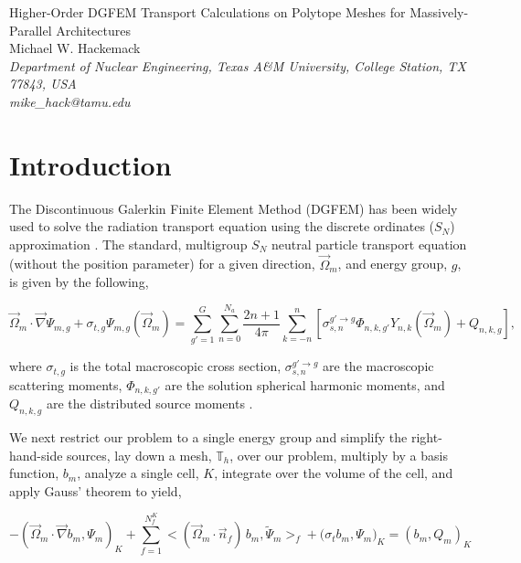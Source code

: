 \documentclass[11pt]{article}
\begin{document}
\begin{center}
{\Large Higher-Order DGFEM Transport Calculations on Polytope Meshes for Massively-Parallel Architectures}\\[8mm]
{Michael W. Hackemack} \\[2mm]
{\em \small Department of Nuclear Engineering, Texas A\&M University, College Station, TX 77843, USA} \\[1mm]
{\em mike\_hack@tamu.edu} \\[6mm]
\end{center}

\section{Introduction}
\label{sec::intro}

The Discontinuous Galerkin Finite Element Method (DGFEM) has been widely used to solve the radiation transport equation using the discrete ordinates ($S_N$) approximation \cite{reed1973triplet}. The standard, multigroup $S_N$ neutral particle transport equation (without the position parameter) for a given direction, $\vec{\Omega}_m$, and energy group, $g$, is given by the following,

\begin{equation}
\label{eq::trans_eq}
\vec{\Omega}_m \cdot \vec{\nabla} \Psi_{m,g} + \sigma_{t,g} \Psi_{m,g} (\vec{\Omega}_m) = \sum_{g'=1}^G \sum_{n=0}^{N_a} \frac{2n+1}{4 \pi} \sum_{k=-n}^{n} \left[ \sigma_{s,n}^{g' \rightarrow g}  \Phi_{n,k,g'} Y_{n,k} (\vec{\Omega}_m) + Q_{n,k,g}  \right] ,
\end{equation}

\noindent where $\sigma_{t,g}$ is the total macroscopic cross section, $\sigma_{s,n}^{g' \rightarrow g}$ are the macroscopic scattering moments, $\Phi_{n,k,g'}$ are the solution spherical harmonic moments, and $Q_{n,k,g}$ are the distributed source moments \cite{lewis1984computational}. 

We next restrict our problem to a single energy group and simplify the right-hand-side sources, lay down a mesh, $\mathbb{T}_h$, over our problem, multiply by a basis function, $b_m$, analyze a single cell, $K$, integrate over the volume of the cell, and apply Gauss' theorem to yield,

\begin{equation}
\label{eq::disc_trans_eq_cellK}
- \left( \vec{\Omega}_m \cdot  \vec{\nabla} b_m, \Psi_{m} \right)_{K} + \sum_{f=1}^{N_f^K} \Big< ( \vec{\Omega}_m \cdot \vec{n}_f ) \, b_m, \tilde{\Psi}_m  \Big>_{f}  + \Big(  \sigma_{t} b_m ,   \Psi_{m} \Big)_{K} = \left(  b_m ,   Q_m \right)_{K}
\end{equation}
\end{document}
